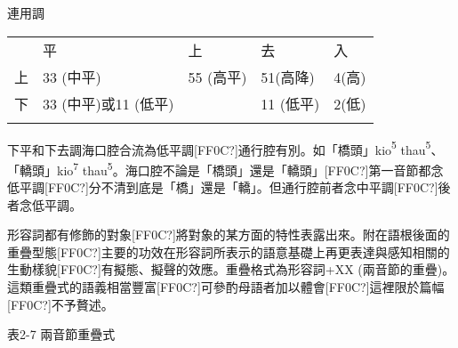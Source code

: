 連用調

\tablefirsthead{}

\tabletail{}
\tablelasttail{}
\begin{tabularx}{\textwidth}{XXXXX} & 平 & 上 & 去 & 入\\
\lsptoprule
上 & 33 (中平) & 55 (高平) & 51(高降) & 4(高)\\
下 & 33 (中平)或11 (低平) &  & 11 (低平) & 2(低)\\
\lspbottomrule
\end{tabularx}
\textrm{下平和下去調海口腔合流為低平調[FF0C?]通行腔有別。如「橋頭」kio}\textrm{\textsuperscript{5}} \textrm{thau}\textrm{\textsuperscript{5}}\textrm{、「轎頭」kio}\textrm{\textsuperscript{7}} \textrm{thau}\textrm{\textsuperscript{5}}\textrm{。海口腔不論是「橋頭」還是「轎頭」[FF0C?]第一音節都念低平調[FF0C?]分不清到底是「橋」還是「轎」。但通行腔前者念中平調[FF0C?]後者念低平調。}

\textrm{形容詞都有修飾的對象[FF0C?]將對象的某方面的特性表露出來。附在語根後面的重疊型態[FF0C?]主要的功效在形容詞所表示的語意基礎上再更表達與感知相關的生動樣貌[FF0C?]有擬態、擬聲的效應。重疊格式為形容詞+XX (兩音節的重疊)}。\textrm{這類重疊式的語義相當豐富[FF0C?]可參酌母語者加以體會[FF0C?]這裡限於篇幅[FF0C?]不予贅述。}

表2-7 兩音節重疊式

\tablefirsthead{}

